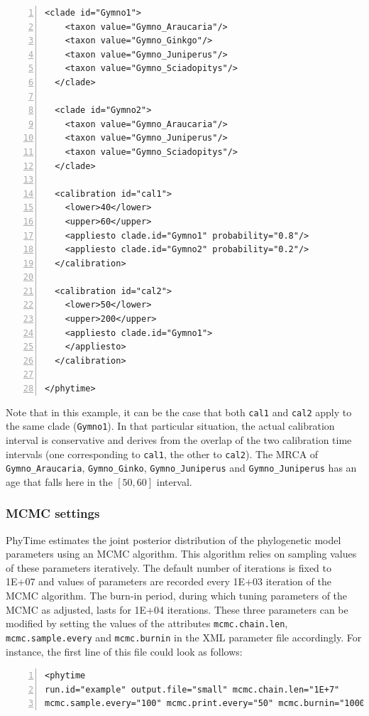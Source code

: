 \documentclass[a4paper,12pt]{article}
\newcommand{\x}[1]{\texttt{#1}}
\begin{document}
\begin{Verbatim}[frame=single, label=Calibrating with uncertainty, samepage=true, baselinestretch=0.5,
  fontsize=\small, numbers=left]
  <clade id="Gymno1">
    <taxon value="Gymno_Araucaria"/>
    <taxon value="Gymno_Ginkgo"/>
    <taxon value="Gymno_Juniperus"/>
    <taxon value="Gymno_Sciadopitys"/>
  </clade>

  <clade id="Gymno2">
    <taxon value="Gymno_Araucaria"/>
    <taxon value="Gymno_Juniperus"/>
    <taxon value="Gymno_Sciadopitys"/>
  </clade>
  
  <calibration id="cal1">
    <lower>40</lower>
    <upper>60</upper>
    <appliesto clade.id="Gymno1" probability="0.8"/>
    <appliesto clade.id="Gymno2" probability="0.2"/>
  </calibration>

  <calibration id="cal2">
    <lower>50</lower>
    <upper>200</upper>
    <appliesto clade.id="Gymno1">
    </appliesto>
  </calibration>

</phytime>
\end{Verbatim}

Note that in this example, it can be the case that both \x{cal1} and \x{cal2} apply to the same
clade (\x{Gymno1}). In that particular situation, the actual calibration interval 
is conservative and derives from the overlap of the two calibration time intervals (one
corresponding to \x{cal1}, the other to \x{cal2}). The MRCA of
\x{Gymno\_Araucaria}, \x{Gymno\_Ginko}, \x{Gymno\_Juniperus} and \x{Gymno\_Juniperus} has an age
that falls here in the $[50,60]$ interval.

\subsubsection{MCMC settings}

PhyTime estimates the joint posterior distribution  of the phylogenetic model parameters  using an
MCMC algorithm. This algorithm relies on sampling values of these parameters iteratively. The
default number of iterations is fixed to 1E+07 and values of parameters are recorded every 1E+03
iteration of the MCMC algorithm. The burn-in period, during which tuning parameters of the MCMC as
adjusted, lasts for 1E+04 iterations. These three parameters can be modified by setting the values
of the attributes \x{mcmc.chain.len}, \x{mcmc.sample.every} and \x{mcmc.burnin} in the XML parameter
file accordingly. For instance, the first line of this file could look as follows: 
\vspace{0.2cm}
\begin{Verbatim}[frame=single, label=MCMC settings, samepage=true, baselinestretch=0.5,
  fontsize=\small, numbers=left]
<phytime
run.id="example" output.file="small" mcmc.chain.len="1E+7" 
mcmc.sample.every="100" mcmc.print.every="50" mcmc.burnin="10000">
\end{Verbatim}
\end{document}
